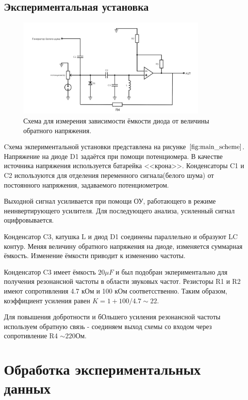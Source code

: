 \documentclass[a4paper, 12pt]{extarticle}
\begin{document}
\subsection*{\textcolor{sub_header}{Экспериментальная установка}}
\begin{figure}[htbp]
    \centering
    \includegraphics[width = 0.85\textwidth]{pics/main.png}
    \caption{Схема для измерения зависимости ёмкости диода от величины обратного напряжения.}
    \label{fig:main_scheme}
\end{figure}

Cхема экпериментальной установки представлена на рисунке $\ref{fig:main_scheme}$.
Напряжение на диоде D1 задаётся при помощи потенциомера. 
В качестве источника напряжения используется батарейка <<крона>>.
Конденсаторы C1 и C2 используются для отделения переменного сигнала(белого шума) от постоянного напряжения, 
задаваемого потенциометром.

Выходной сигнал усиливается при помощи ОУ, работающего в режиме неинвертирующего усилителя.
Для последующего анализа, усиленный сигнал оцифровывается.

Конденсатор C3, катушка L и диод D1 соединены параллельно и образуют LC контур. 
Меняя величину обратного напряжения на диоде, изменяется суммарная ёмкость. Изменение
ёмкости приводит к изменению частоты.
 

Конденсатор C3 имеет ёмкость $20 \mu F$ и был подобран экпериментально для получения резонансной
частоты в области звуковых частот. Резисторы R1 и R2 имеют сопротивления 4.7 кОм и 100 кОм соответсственно.
Таким образом, коэффициент усиления равен $K = 1 + 100 / 4.7 \sim 22$. 

Для повышения добротности и бОльшего усиления резонансной частоты используем обратную связь - 
соединяем выход схемы со входом через сопротивление R4 $\sim 220 \text{Ом}$.

\section*{\textcolor{header}{Обработка экспериментальных данных}}
\end{document}
